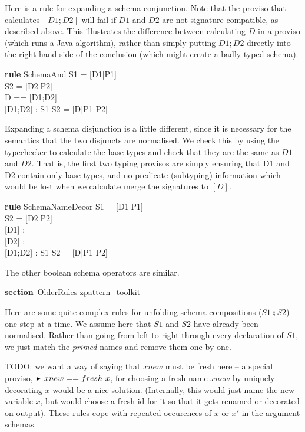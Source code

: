 \documentclass{article}
\newenvironment{zsection}{\begin{zed}}{\end{zed}}
\newcommand{\SECTION}{\textbf{section}~}
\newcommand{\parents}{\mathrel{\textbf{parents}}}
\newenvironment{zedrule}[1]{\par\textbf{rule }#1\vspace{-2ex}\infrule}{\endinfrule}
\newcommand{\derives}{\derive{}}
\newcommand{\proviso}{\raisebox{0.5ex}{${}_{\blacktriangleright}\ $}}%
\begin{document}
 
Here is a rule for expanding a schema conjunction.
Note that the proviso that calculates $[D1;D2]$ will fail
if $D1$ and $D2$ are not signature compatible, as described above.
This illustrates the difference between calculating $D$ in
a proviso (which runs a Java algorithm), rather than simply
putting $D1;D2$ directly into the right hand side of the
conclusion (which might create a badly typed schema).

\begin{zedrule}{SchemaAnd}
  S1 = [D1|P1] \\
  S2 = [D2|P2] \\
  \proviso D == [D1;D2] \\
  \proviso [D1;D2] : \power [D]
\derives
  S1 \land S2 = [D|P1 \land P2]
\end{zedrule}


Expanding a schema disjunction is a little different,
since it is necessary for the semantics that the two
disjuncts are normalised.  We check this by using
the typechecker to calculate the base types and check
that they are the same as $D1$ and $D2$.  That is,
the first two typing provisos are simply ensuring
that D1 and D2 contain only base types, and no predicate
(subtyping) information which would be lost when
we calculate merge the signatures to $[D]$.

\begin{zedrule}{SchemaNameDecor}
  S1 = [D1|P1] \\
  S2 = [D2|P2] \\
  \proviso [D1] : \power [D1] \\
  \proviso [D2] : \power [D2] \\
  \proviso [D1;D2] : \power [D]
\derives
  S1 \lor S2 = [D|P1 \lor P2]
\end{zedrule}

The other boolean schema operators are similar.

\begin{zsection}
  \SECTION OlderRules \parents zpattern\_toolkit
\end{zsection}

Here are some quite complex rules for unfolding schema compositions
($S1 \semi S2$) one step at a time.  We assume here that $S1$
and $S2$ have already been normalised.  Rather than going from
left to right through every declaration of $S1$, we just match
the \emph{primed} names and remove them one by one.

TODO: we want a way of saying that $xnew$ must be fresh here
-- a special proviso, $\proviso xnew == fresh~x$, for choosing a
fresh name $xnew$ by uniquely decorating $x$ would be a nice solution.
(Internally, this would just name the new variable $x$, but would 
choose a fresh id for it so that it gets renamed or decorated on output).
These rules cope with repeated occurences of $x$ or $x'$
in the argument schemas.
\end{document}
